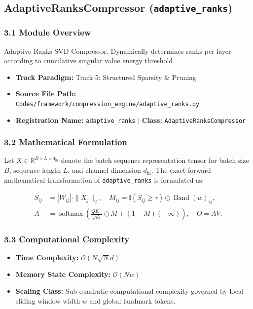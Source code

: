\subsection{AdaptiveRanksCompressor (\texttt{adaptive\_ranks})}
\label{sec:app_module_adaptive\_ranks}

\subsubsection*{3.1 Module Overview}
Adaptive Ranks SVD Compressor. Dynamically determines ranks per layer according to cumulative singular value energy threshold.
\begin{itemize}
    \item \textbf{Track Paradigm:} Track 5: Structured Sparsity & Pruning
    \item \textbf{Source File Path:} \texttt{Codes/framework/compression\_engine/adaptive\_ranks.py}
    \item \textbf{Registration Name:} \texttt{adaptive\_ranks} $\mid$ \textbf{Class:} \texttt{AdaptiveRanksCompressor}
\end{itemize}

\subsubsection*{3.2 Mathematical Formulation}
Let $X \in \mathbb{R}^{B \times L \times d_{\text{in}}}$ denote the batch sequence representation tensor for batch size $B$, sequence length $L$, and channel dimension $d_{\text{in}}$. The exact forward mathematical transformation of \texttt{adaptive\_ranks} is formulated as:

\begin{align}
S_{ij} &= |W_{ij}| \cdot \|X_j\|_2, \quad M_{ij} = \mathbb{I}(S_{ij} \ge \tau) \odot \operatorname{Band}(w)_{ij}, \\
A &= \operatorname{softmax}\left(\frac{Q K^\top}{\sqrt{d_k}} \odot M + (1 - M)(-\infty)\right), \quad O = A V.
\end{align}


\subsubsection*{3.3 Computational Complexity}
\begin{itemize}
    \item \textbf{Time Complexity:} $\mathcal{O}(N \sqrt{N} d)$
    \item \textbf{Memory State Complexity:} $\mathcal{O}(N w)$
    \item \textbf{Scaling Class:} Sub-quadratic computational complexity governed by local sliding window width $w$ and global landmark tokens.
\end{itemize}

